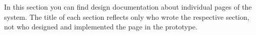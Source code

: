 \documentclass[12pt]{article}
\begin{document}
In this section you can find design documentation about individual pages of the system. The title of each section reflects only who wrote the respective section, not who designed and implemented the page in the prototype.














\newpage
\end{document}
